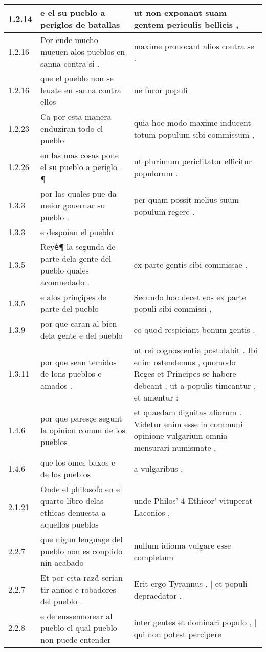 \begin{tabular}{|p{1cm}|p{6.5cm}|p{6.5cm}|}
1.2.14 & e el su pueblo a periglos de batallas & ut non exponant suam gentem periculis bellicis , \\\hline
1.2.16 & Por ende mucho mueuen alos pueblos en sanna contra si . & maxime prouocant alios contra se . \\\hline
1.2.16 & que el pueblo non se leuate en sanna contra ellos & ne furor populi \\\hline
1.2.23 & Ca por esta manera enduziran todo el pueblo & quia hoc modo maxime inducent totum populum sibi commissum , \\\hline
1.2.26 & en las mas cosas pone el su pueblo a periglo . ¶ & ut plurimum periclitator efficitur populorum . \\\hline
1.3.3 & por las quales pue da meior gouernar su pueblo . & per quam possit melius suum populum regere . \\\hline
1.3.3 & e despoian el pueblo &  \\\hline
1.3.5 & Reyeᷤ¶ la segunda de parte dela gente del pueblo quales acomnedado . & ex parte gentis sibi commissae . \\\hline
1.3.5 & e alos prinçipes de parte del pueblo & Secundo hoc decet eos ex parte populi sibi commissi , \\\hline
1.3.9 & por que caran al bien dela gente e del pueblo & eo quod respiciant bonum gentis . \\\hline
1.3.11 & por que sean temidos de lons pueblos e amados . & ut rei cognoscentia postulabit . Ibi enim ostendemus , quomodo Reges et Principes se habere debeant , ut a populis timeantur , et amentur : \\\hline
1.4.6 & por que paresçe segunt la opinion comun de los pueblos & et quaedam dignitas aliorum . Videtur enim esse in communi opinione vulgarium omnia mensurari numismate , \\\hline
1.4.6 & que los omes baxos e de los pueblos & a vulgaribus , \\\hline
2.1.21 & Onde el philosofo en el quarto libro delas ethicas denuesta a aquellos pueblos & unde Philos’ 4 Ethicor’ vituperat Laconios , \\\hline
2.2.7 & que nigun lenguage del pueblo non es conplido nin acabado & nullum idioma vulgare esse completum \\\hline
2.2.7 & Et por esta razd̃ serian tir annos e robadores del pueblo . & Erit ergo Tyrannus , | et populi depraedator . \\\hline
2.2.8 & e de enssennorear al pueblo el qual pueblo non puede entender & inter gentes et dominari populo , | qui non potest percipere \\\hline

\end{tabular}
